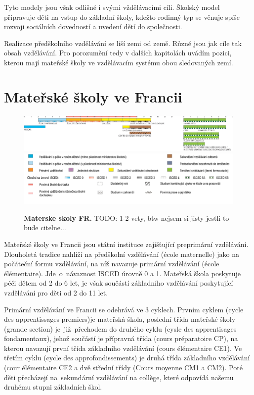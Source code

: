 		Tyto modely jsou však odlišné i svými vždělávacími cíli. Školský model připravuje děti na vstup do základní školy, kdežto rodinný typ se věnuje spíše rozvoji sociálních dovedností a uvedení dětí do společnosti.

		Realizace předškolního vzdělávání se liší zemi od země. Různé jsou jak cíle tak obsah vzdělávání. Pro porozumění tedy v dalších kapitolách uvádím pozici, kterou mají mateřské školy ve vzdělávacím systému obou sledovaných zemí. 
		

	\section{Mateřské školy ve Francii}
	\label{msvefr}


		\begin{figure} [h!]
			\includegraphics[width=1.0\linewidth]{fotky/msFR.png} \\
			\includegraphics[width=1.0\linewidth]{fotky/msVysvetlivky.png}
			\caption{ \textbf{Materske skoly FR.}
				TODO: 1-2 vety, btw nejsem si jisty jestli to bude citelne...
			}
			\label{obr:msFR}
		\end{figure}
		Mateřské školy ve Francii jsou státní instituce zajišťující preprimární vzdělávání. Dlouholetá tradice nahlíží na předškolní vzdělávání (école maternelle) jako na počáteční formu vzdělávání, na níž navazuje primární vzdělávání (école élémentaire). Jde o návaznost ISCED  úrovně 0 a 1. Mateřská škola poskytuje péči dětem od 2 do 6 let, je však součástí základního vzdělávání poskytující vzdělávání pro děti od 2 do 11 let.

		Primární vzdělávání ve Francii se odehrává ve 3 cyklech. Prvním cyklem (cycle des apprentissages premiers)je mateřská škola, poslední třída mateřské školy (grande section) je již přechodem do druhého cyklu (cysle des apprentisages fondamentaux), jehož součástí je přípravná třída (cours préparatoire CP), na kterou navazují první třída základního vzdělávání (cours élémentaire CE1). Ve třetím cyklu (cycle des approfondissements) je druhá třída základního vzdělávání (cour élémentaire CE2 a dvě střední třídy (Cours moyenne CM1 a CM2). Poté děti přecházejí na sekundární vzdělávání na collège, které odpovídá našemu druhému stupni základních škol. 

